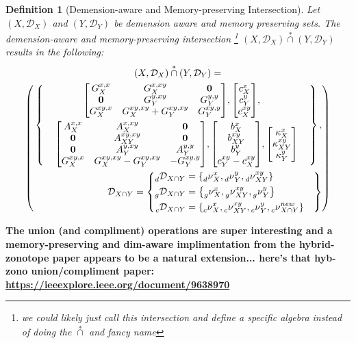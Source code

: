 \documentclass[11pt]{article}
\newtheorem{definition}{Definition}
\newcommand{\Key}{\nu} %
\newcommand{\Dict}{\mathcal{D}} %
\newcommand{\dimKey}{\prescript{}{d}{\Key}} %
\newcommand{\dimDict}{\prescript{}{d}{\Dict}} %
\newcommand{\factorKey}{\prescript{}{g}{\Key}} %
\newcommand{\factorDict}{\prescript{}{g}{\Dict}} %
\newcommand{\conKey}{\prescript{}{c}{\Key}} %
\newcommand{\conDict}{\prescript{}{c}{\Dict}} %
\newcommand{\starCap}{\overset{*}{\cap}} %
\newcommand{\dSet}{\kappa} %
\begin{document}
\begin{definition}[Demension-aware and Memory-preserving Intersection]
	Let $(X,\Dict_{X})$ and $(Y,\Dict_{Y})$ be demension aware and memory preserving sets.
	The demension-aware and memory-preserving intersection \footnote{we could likely just call this intersection and define a specific algebra instead of doing the $\starCap$ and fancy name} $(X,\Dict_{X}) \starCap (Y,\Dict_{Y})$ results in the following:
	\begin{multline}
		(X,\Dict_{X}) \starCap (Y,\Dict_{Y}) = \\
		\left(
			\begin{multlined}
			\left\{
			\begin{gathered}
				\mqty[
				G_{X}^{x,x} & G_{X}^{x,xy} & \vb{0}\\
				\vb{0}		& G_{Y}^{y,xy} & G_{Y}^{y,y}\\
				G_{X}^{xy,x} & G_{X}^{xy,xy} + G_{Y}^{xy,xy} & G_{Y}^{xy,y}
			],
			\mqty[
				c_{X}^{x}\\
				c_{Y}^{y}\\
				c_{X}^{xy}
			],\\
			\mqty[
				A_{X}^{x,x} 	& A_{X}^{x,xy} & \vb{0}\\
				\vb{0}		& A_{XY}^{xy,xy}	& \vb{0}\\
				\vb{0}		& A_{Y}^{y,xy} & A_{Y}^{y,y}\\
				G_{X}^{xy,x}	& G_{X}^{xy,xy} - G_{Y}^{xy,xy} & -G_{Y}^{xy,y}
			],
			\mqty[
				b_{X}^{x}\\
				b_{XY}^{xy}\\
				b_{Y}^{y}\\
				c_{Y}^{xy} - c_{X}^{xy}
			],
			\mqty[
				\dSet_{X}^{x}\\
				\dSet_{XY}^{xy}\\
				\dSet_{Y}^{y}
			]
			\end{gathered}
		\right\},\\
		\Dict_{X\cap Y} = \left\{
			\begin{aligned}
				\dimDict_{X \cap Y} &= \qty{
				\dimKey_{X}^{x}, \dimKey_{Y}^{y}, \dimKey_{XY}^{xy}
			}\\
			\factorDict_{X \cap Y} &= \qty{
				\factorKey_{X}^{x},\factorKey_{XY}^{xy},\factorKey_{Y}^{y}
			}\\
			\conDict_{X \cap Y} &= \qty{
				\conKey_{X}^{x},\conKey_{XY}^{xy},\conKey_{Y}^{y},\conKey_{X \cap Y}^{new}
			}
			\end{aligned}
		\right\}
		\end{multlined}
		\right)
	\end{multline}
\end{definition}


\textbf{
	The union (and compliment) operations are super interesting and a memory-preserving and dim-aware implimentation from the hybrid-zonotope paper appears to be a natural extension... here's that hyb-zono union/compliment paper:
	\url{https://ieeexplore.ieee.org/document/9638970}
}
\end{document}
